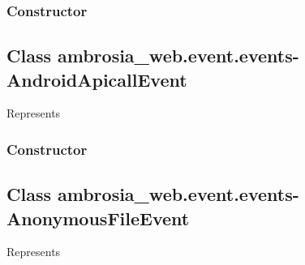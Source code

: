 \documentclass[letterpaper,10pt,english]{sphinxmanual}
\begin{document}
\subsubsection{Constructor}
\label{ambrosia_web.event.events-AndroidApicall:constructor}

\begin{fulllineitems}
\label{ambrosia_web.event.events-AndroidApicall:ambrosia_web.event.events-AndroidApicall}
\end{fulllineitems}



\subsection{Class ambrosia\_web.event.events-AndroidApicallEvent}
\label{ambrosia_web.event.events-AndroidApicallEvent:class-ambrosia-web-event-events-androidapicallevent}\label{ambrosia_web.event.events-AndroidApicallEvent::doc}
Represents {\hyperref[ambrosia_plugins.apimonitor:ambrosia_plugins.apimonitor.AndroidApicallEvent]{}}


\subsubsection{Constructor}
\label{ambrosia_web.event.events-AndroidApicallEvent:constructor}

\begin{fulllineitems}
\label{ambrosia_web.event.events-AndroidApicallEvent:ambrosia_web.event.events-AndroidApicallEvent}
\end{fulllineitems}



\subsection{Class ambrosia\_web.event.events-AnonymousFileEvent}
\label{ambrosia_web.event.events-AnonymousFileEvent:class-ambrosia-web-event-events-anonymousfileevent}\label{ambrosia_web.event.events-AnonymousFileEvent::doc}
Represents {\hyperref[ambrosia_plugins.lkm:ambrosia_plugins.lkm.events.AnonymousFileEvent]{}}
\end{document}
